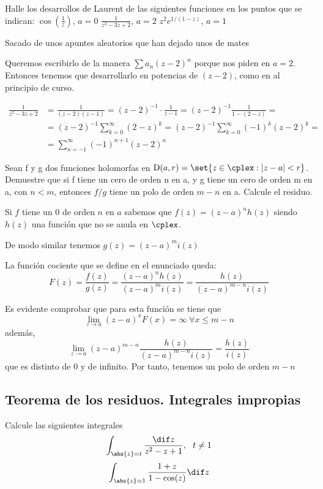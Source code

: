 \begin{problem}
Halle los desarrollos de Laurent de las siguientes funciones en los puntos que se indican:
\ppart $\cos \left(\frac{1}{z}\right)$, $a = 0$
\ppart $\frac{1}{z^2 - 3z + 2}$, $a = 2$
\ppart $z^2 e^{1/(1 - z)}$, $a = 1$

\solution
\spart

\spart
\textcolor{JungleGreen}{Sacado de unos apuntes aleatorios que han dejado unos de mates}

Queremos escribirlo de la manera $\sum a_n (z-2)^n$ porque nos piden en $a=2$. Entonces tenemos que desarrollarlo en potencias de $(z-2)$, como en al principio de curso.

\begin{align*}
\frac{1}{z^2 - 3z + 2} &= \frac{1}{(z-2)(z-1)} = (z-2)^{-1}·\frac{1}{z-1} = (z-2)^{-1}\frac{1}{1-(2-z)} = \\
 &=(z-2)^{-1} \sum_{k=0}^{∞}(2-z)^k =  (z-2)^{-1} \sum_{k=0}^{∞}(-1)^k(z-2)^k =\\
 &=\sum_{n=-1}^{∞}(-1)^{n+1}(z-2)^n
\end{align*}

\end{problem}

\begin{problem}
Sean f y g dos funciones holomorfas en ${\mbox D(a, r) = \set{z \in \cplex : |z - a| < r}}$. Demuestre que si f tiene un cero de orden n en a, y g tiene un cero de orden m en a, con $n < m$, entonces $f / g$ tiene un polo de orden $m - n$ en a. Calcule el residuo.
\solution


Si $f$ tiene un 0 de orden $n$ en $a$ sabemos que $f(z)=(z-a)^nh(z)$ siendo $h(z)$ una función que no se anula en $\cplex$.

De modo similar tenemos $g(z)=(z-a)^mi(z)$

La función cociente que se define en el enunciado queda:
\[F(z)=\frac{f(z)}{g(z)}=\frac{(z-a)^nh(z)}{(z-a)^mi(z)} =\frac{h(z)}{(z-a)^{m-n}i(z)}\]

Es evidente comprobar que para esta función se tiene que
\[\lim_{z \to a } (z-a)^xF(x)=\infty \ \forall x \leq {m-n}\]
además,
\[\lim_{z \to a } (z-a)^{m-n}\frac{h(z)}{(z-a)^{m-n}i(z)} = \frac{h(z)}{i(z)}\]
que es distinto de 0 y de infinito. Por tanto, tenemos un polo de orden $m-n$
\end{problem}

\subsection{Teorema de los residuos. Integrales impropias}
\begin{problem}
Calcule las siguientes integrales
\ppart
\[\int_{\abs{z}=t} \frac{\dif z}{z^2 - z + 1}, \ \ t \neq 1\]
\ppart
\[\int_{\abs{z}=1} \frac{1 + z}{1 - \cos(z)} \dif z\]
\solution

\end{problem}

